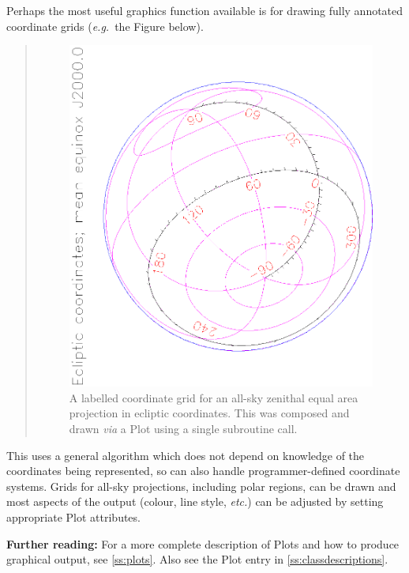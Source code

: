 \documentclass[twoside,11pt]{article}
\newcommand{\appref}[1]{Appendix~\ref{#1}}
\newcommand{\secref}[1]{\S\ref{#1}}
\renewcommand{\appref}[1]{\ref{#1}}
\renewcommand{\secref}[1]{\ref{#1}}
\begin{document}
\begin{htmlonly}
   Perhaps the most useful graphics function available is for drawing
   fully annotated coordinate grids ({\em{e.g.}}\ the Figure below).
   \begin{quote}
   \begin{figure}
   \label{fig:gridplot}
   \includegraphics[scale=1.2,angle=-90]{sun210_figures/gridplot.eps}
   \caption{A labelled coordinate grid for an all-sky zenithal equal area
   projection in ecliptic coordinates. This was composed and drawn
   {\em{via}} a Plot using a
   single subroutine call.}
   \end{figure}
   \end{quote}
\end{htmlonly}
This uses a general algorithm which does not depend on knowledge of
the coordinates being represented, so can also handle
programmer-defined coordinate systems.  Grids for all-sky projections,
including polar regions, can be drawn and most aspects of the output
(colour, line style, {\em{etc.}}) can be adjusted by setting
appropriate Plot attributes.

{\bf{Further reading:}} For a more complete description of
Plots and how to produce graphical output, see \secref{ss:plots}. Also
see the Plot entry in \appref{ss:classdescriptions}.
\end{document}
